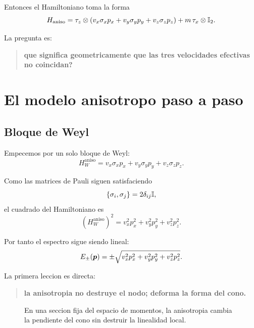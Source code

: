 Entonces el Hamiltoniano toma la forma
\begin{equation}
H_{\mathrm{aniso}}
=
\tau_z\otimes\left(v_x\sigma_x p_x + v_y\sigma_y p_y + v_z\sigma_z p_z\right)
+ m\,\tau_x\otimes\mathbb{I}_2.
\label{c22:eq:Haniso}
\end{equation}

La pregunta es:
\begin{quote}
\textbf{que significa geometricamente que las tres velocidades efectivas no coincidan?}
\end{quote}

\section{El modelo anisotropo paso a paso}
\subsection{Bloque de Weyl}
Empecemos por un solo bloque de Weyl:
\begin{equation}
H_W^{\mathrm{aniso}}
=
v_x\sigma_x p_x + v_y\sigma_y p_y + v_z\sigma_z p_z.
\label{c22:eq:WeylAniso}
\end{equation}

Como las matrices de Pauli siguen satisfaciendo
\begin{equation}
\{\sigma_i,\sigma_j\}=2\delta_{ij}\mathbb{I},
\end{equation}
el cuadrado del Hamiltoniano es
\begin{equation}
\left(H_W^{\mathrm{aniso}}\right)^2
=
v_x^2 p_x^2 + v_y^2 p_y^2 + v_z^2 p_z^2.
\end{equation}

Por tanto el espectro sigue siendo lineal:
\begin{equation}
E_\pm(\bm{p})=\pm\sqrt{v_x^2 p_x^2 + v_y^2 p_y^2 + v_z^2 p_z^2}.
\label{c22:eq:dispersionAniso}
\end{equation}

La primera leccion es directa:
\begin{quote}
\textbf{la anisotropia no destruye el nodo; deforma la forma del cono.}
\end{quote}

\begin{figure}[h!]
\centering
{}
\caption{En una seccion fija del espacio de momentos, la anisotropia cambia la pendiente del cono sin destruir la linealidad local.}
\end{figure}

